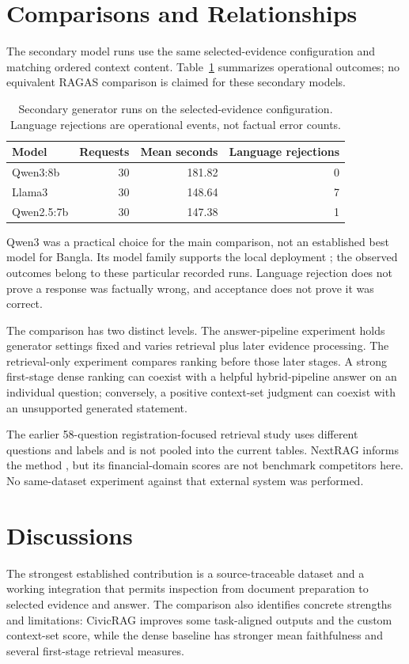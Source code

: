 \section{Comparisons and Relationships}
The secondary model runs use the same selected-evidence configuration and matching ordered context content. Table~\ref{tab:models-final} summarizes operational outcomes; no equivalent RAGAS comparison is claimed for these secondary models.
\begin{table}[htbp]\centering\small
\caption{Secondary generator runs on the selected-evidence configuration. Language rejections are operational events, not factual error counts.}\label{tab:models-final}
\begin{tabularx}{\linewidth}{Xrrr}\toprule
Model & Requests & Mean seconds & Language rejections\\\midrule
Qwen3:8b & 30 & 181.82 & 0\\
Llama3 & 30 & 148.64 & 7\\
Qwen2.5:7b & 30 & 147.38 & 1\\\bottomrule
\end{tabularx}\end{table}
Qwen3 was a practical choice for the main comparison, not an established best model for Bangla. Its model family supports the local deployment \cite{qwen3}; the observed outcomes belong to these particular recorded runs. Language rejection does not prove a response was factually wrong, and acceptance does not prove it was correct.

The comparison has two distinct levels. The answer-pipeline experiment holds generator settings fixed and varies retrieval plus later evidence processing. The retrieval-only experiment compares ranking before those later stages. A strong first-stage dense ranking can coexist with a helpful hybrid-pipeline answer on an individual question; conversely, a positive context-set judgment can coexist with an unsupported generated statement.

The earlier 58-question registration-focused retrieval study uses different questions and labels and is not pooled into the current tables. NextRAG informs the method \cite{nextrag}, but its financial-domain scores are not benchmark competitors here. No same-dataset experiment against that external system was performed.

\section{Discussions}
The strongest established contribution is a source-traceable dataset and a working integration that permits inspection from document preparation to selected evidence and answer. The comparison also identifies concrete strengths and limitations: CivicRAG improves some task-aligned outputs and the custom context-set score, while the dense baseline has stronger mean faithfulness and several first-stage retrieval measures.

